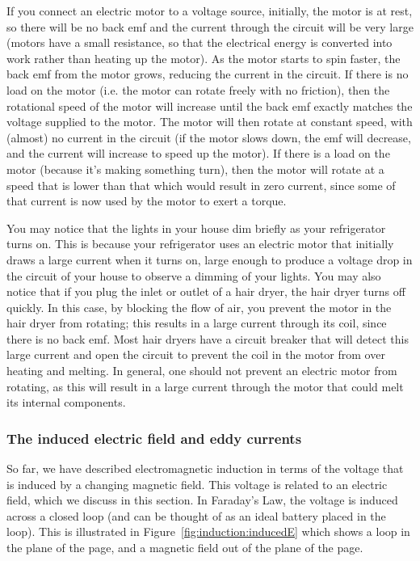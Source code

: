 If you connect an electric motor to a voltage source, initially, the motor is at rest, so there will be no back emf and the current through the circuit will be very large (motors have a small resistance, so that the electrical energy is converted into work rather than heating up the motor). As the motor starts to spin faster, the back emf from the motor grows, reducing the current in the circuit. If there is no load on the motor (i.e. the motor can rotate freely with no friction), then the rotational speed of the motor will increase until the back emf exactly matches the voltage supplied to the motor. The motor will then rotate at constant speed, with (almost) no current in the circuit (if the motor slows down, the emf will decrease, and the current will increase to speed up the motor). If there is a load on the motor (because it's making something turn), then the motor will rotate at a speed that is lower than that which would result in zero current, since some of that current is now used by the motor to exert a torque.

You may notice that the lights in your house dim briefly as your refrigerator turns on. This is because your refrigerator uses an electric motor that initially draws a large current when it turns on, large enough to produce a voltage drop in the circuit of your house to observe a dimming of your lights. You may also notice that if you plug the inlet or outlet of a hair dryer, the hair dryer turns off quickly. In this case, by blocking the flow of air, you prevent the motor in the hair dryer from rotating; this results in a large current through its coil, since there is no back emf. Most hair dryers have a circuit breaker that will detect this large current and open the circuit to prevent the coil in the motor from over heating and melting. In general, one should not prevent an electric motor from rotating, as this will result in a large current through the motor that could melt its internal components.

\subsubsection{The induced electric field and eddy currents}

So far, we have described electromagnetic induction in terms of the voltage that is induced by a changing magnetic field. This voltage is related to an electric field, which we discuss in this section. In Faraday's  Law, the voltage is induced across a closed loop (and can be thought of as an ideal battery placed in the loop). This is illustrated in Figure~\ref{fig:induction:inducedE} which shows a loop in the plane of the page, and a magnetic field out of the plane of the page.

